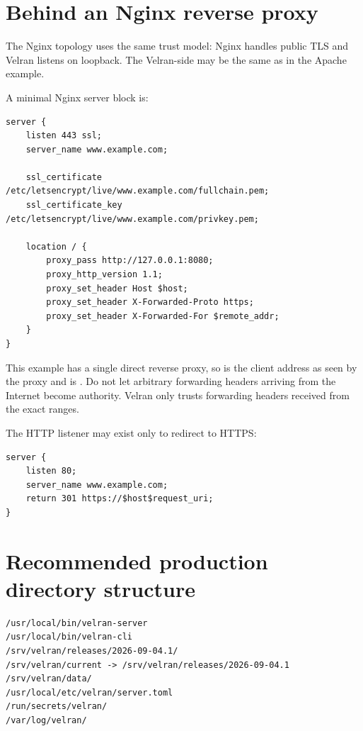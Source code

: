 \section{Behind an Nginx reverse proxy}

The Nginx topology uses the same trust model: Nginx handles public TLS and Velran listens on loopback. The Velran-side  may be the same as in the Apache example.

A minimal Nginx server block is:

\begin{lstlisting}
server {
    listen 443 ssl;
    server_name www.example.com;

    ssl_certificate     /etc/letsencrypt/live/www.example.com/fullchain.pem;
    ssl_certificate_key /etc/letsencrypt/live/www.example.com/privkey.pem;

    location / {
        proxy_pass http://127.0.0.1:8080;
        proxy_http_version 1.1;
        proxy_set_header Host $host;
        proxy_set_header X-Forwarded-Proto https;
        proxy_set_header X-Forwarded-For $remote_addr;
    }
}
\end{lstlisting}

This example has a single direct reverse proxy, so  is the client address as seen by the proxy and  is . Do not let arbitrary forwarding headers arriving from the Internet become authority. Velran only trusts forwarding headers received from the exact  ranges.

The HTTP listener may exist only to redirect to HTTPS:

\begin{lstlisting}
server {
    listen 80;
    server_name www.example.com;
    return 301 https://$host$request_uri;
}
\end{lstlisting}

\section{Recommended production directory structure}

\begin{lstlisting}
/usr/local/bin/velran-server
/usr/local/bin/velran-cli
/srv/velran/releases/2026-09-04.1/
/srv/velran/current -> /srv/velran/releases/2026-09-04.1
/srv/velran/data/
/usr/local/etc/velran/server.toml
/run/secrets/velran/
/var/log/velran/
\end{lstlisting}

